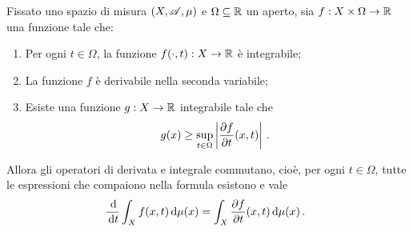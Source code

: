 \begin{theorem} \label{thm:CommutazioneDerivataIntegrale}
	Fissato uno spazio di misura $(X,\mathscr A,\mu)$ e $\Omega\subseteq\mathbb R$ un aperto, sia $f:X\times\Omega\to\mathbb R$ una funzione tale che:
	\begin{enumerate}
		\item Per ogni $t\in\Omega$, la funzione $f({}\cdot,t):X\to\mathbb R$ è integrabile; \label{it:CommutazioneIntegrabile}
		\item La funzione $f$ è derivabile nella seconda variabile; \label{it:CommutazioneDerivabile}
		\item Esiste una funzione $g:X\to\mathbb R$ integrabile tale che \label{it:CommutazioneDominazione}
		\begin{equation*}
			g(x)\ge \sup_{t\in\Omega}\left\lvert \frac{\partial f}{\partial t}(x,t)\right\rvert \, \text{. }
		\end{equation*}
	\end{enumerate}
	Allora gli operatori di derivata e integrale commutano, cioè, per ogni $t\in\Omega$, tutte le espressioni che compaiono nella formula esistono e vale
	\begin{equation*}
		\frac{\,\mathrm d}{\,\mathrm d t}\int_X f(x,t)\,\mathrm d \mu(x)=\int_X\frac{\partial f}{\partial t}(x,t)\,\mathrm d\mu(x) \, \text{. }
	\end{equation*}
\end{theorem}
